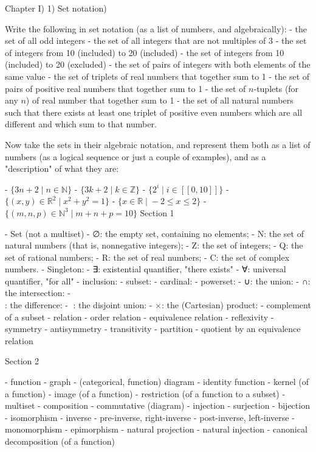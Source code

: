 \documentclass[12pt, letterpaper, twoside]{article}
\begin{document}
\author{Multiversity \textit{Algebra Chapter 0} Reading Group}

Chapter I) 1) Set notation)

Write the following in set notation (as a list of numbers, and algebraically):
- the set of all odd integers
- the set of all integers that are not multiples of 3
- the set of integers from 10 (included) to 20 (included)
- the set of integers from 10 (included) to 20 (excluded)
- the set of pairs of integers with both elements of the same value
- the set of triplets of real numbers that together sum to 1
- the set of pairs of positive real numbers that together sum to 1
- the set of $n$-tuplets (for any $n$) of real number that together sum to 1
- the set of all natural numbers such that there exists at least one triplet of positive even numbers which are all different and which sum to that number.

Now take the sets in their algebraic notation, and represent them both as a list of numbers (as a logical sequence or just a couple of examples), and as a "description" of what they are:

 - $\{3n + 2 \; | \; n \in \mathbb{N} \}$
 - $\{3k + 2 \; | \; k \in \mathbb{Z} \}$
 - $\{ 2^i \; | \; i \in [[0, 10]] \}$
 - $\{ (x, y) \in \mathbb{R}^2 \; | \; x^2 + y^2 = 1 \}$
 - $\{ x \in \mathbb{R} \; | \; -2 \leq x \leq 2 \}$
 - $\{ (m, n, p) \in \mathbb{N}^3 \; | \; m + n + p = 10 \}$
Section 1

  - Set (not a multiset)
  - ∅: the empty set, containing no elements;
  - N: the set of natural numbers (that is, nonnegative integers);
  - Z: the set of integers;
  - Q: the set of rational numbers;
  - R: the set of real numbers;
  - C: the set of complex numbers.
  - Singleton:
  - ∃: existential quantifier, "there exists"
  - ∀: universal quantifier, "for all"
  - inclusion:
  - subset:
  - cardinal:
  - powerset:
  - ∪: the union:
  - ∩: the intersection:
  - \\: the difference:
  - : the disjoint union:
  - ×: the (Cartesian) product:
  - complement of a subset
  - relation
  - order relation
  - equivalence relation
  - reﬂexivity
  - symmetry
  - antisymmetry
  - transitivity
  - partition
  - quotient by an equivalence relation


Section 2

  - function
  - graph
  - (categorical, function) diagram
  - identity function
  - kernel (of a function)
  - image (of a function)
  - restriction (of a function to a subset)
  - multiset
  - composition
  - commutative (diagram)
  - injection
  - surjection
  - bijection
  - isomorphism
  - inverse
  - pre-inverse, right-inverse
  - post-inverse, left-inverse
  - monomorphism
  - epimorphism
  - natural projection
  - natural injection
  - canonical decomposition (of a function)
\end{document}
